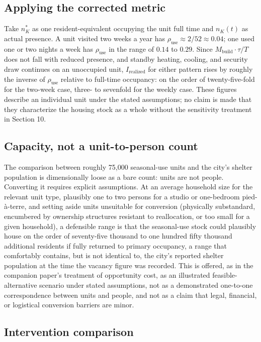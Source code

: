\documentclass[11pt]{article}
\begin{document}
\subsection{Applying the corrected metric}

Take $n_K^{*}$ as one resident-equivalent occupying the unit full time and $n_K(t)$ as actual presence. A unit visited two weeks a year has $\rho_{\text{use}} \approx 2/52 \approx 0.04$; one used one or two nights a week has $\rho_{\text{use}}$ in the range of $0.14$ to $0.29$. Since $M_{\text{build}}\cdot\tau/T$ does not fall with reduced presence, and standby heating, cooling, and security draw continues on an unoccupied unit, $I_{\text{realized}}$ for either pattern rises by roughly the inverse of $\rho_{\text{use}}$ relative to full-time occupancy: on the order of twenty-five-fold for the two-week case, three- to sevenfold for the weekly case. These figures describe an individual unit under the stated assumptions; no claim is made that they characterize the housing stock as a whole without the sensitivity treatment in Section 10.

\subsection{Capacity, not a unit-to-person count}

The comparison between roughly 75{,}000 seasonal-use units and the city's shelter population is dimensionally loose as a bare count: units are not people. Converting it requires explicit assumptions. At an average household size for the relevant unit type, plausibly one to two persons for a studio or one-bedroom pied-\`a-terre, and setting aside units unsuitable for conversion (physically substandard, encumbered by ownership structures resistant to reallocation, or too small for a given household), a defensible range is that the seasonal-use stock could plausibly house on the order of seventy-five thousand to one hundred fifty thousand additional residents if fully returned to primary occupancy, a range that comfortably contains, but is not identical to, the city's reported shelter population at the time the vacancy figure was recorded. This is offered, as in the companion paper's treatment of opportunity cost, as an illustrated feasible-alternative scenario under stated assumptions, not as a demonstrated one-to-one correspondence between units and people, and not as a claim that legal, financial, or logistical conversion barriers are minor.

\subsection{Intervention comparison}
\end{document}
